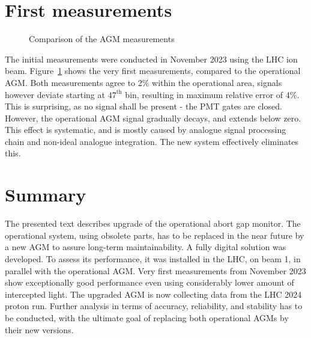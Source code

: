 \section{First measurements}
\begin{figure}[!htb]
    \begin{center}
        \scalebox{0.54}{}
        \caption{Comparison of the AGM measurements}
        \label{fig:comparison_chart}
    \end{center}
\end{figure}

The initial measurements were conducted in November 2023 using the LHC ion beam.
%
Figure~\ref{fig:comparison_chart} shows the very first measurements, compared to the operational AGM.
%
Both measurements agree to 2\% within the operational area, signals however deviate starting at $47^{\text{th}}$ bin, resulting in maximum relative error of 4\%.
%
This is surprising, as no signal shall be present - the PMT gates are closed. 
%
However, the operational AGM signal gradually decays, and extends below zero.
%
This effect is systematic, and is mostly caused by analogue signal processing chain and non-ideal analogue integration.
%
The new system effectively eliminates this.


\section{Summary}
The presented text describes upgrade of the operational abort gap monitor. 
%
The operational system, using obsolete parts, has to be replaced in the near future by a new AGM to assure long-term maintainability.
%
A fully digital solution was developed.
%
To assess its performance, it was installed in the LHC, on beam 1, in parallel with the operational AGM.
%
Very first measurements from November 2023 show exceptionally good performance even using considerably lower amount of intercepted light.
%
The upgraded AGM is now collecting data from the LHC 2024 proton run.
%
Further analysis in terms of accuracy, reliability, and stability has to be conducted, with the ultimate goal of replacing both operational AGMs by their new versions.





